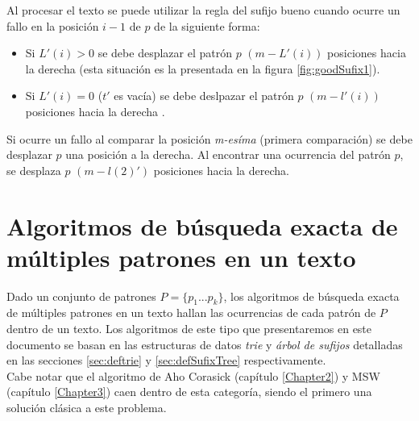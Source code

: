 \myrule{}{}
Al procesar el texto se puede utilizar la regla del sufijo bueno cuando ocurre un fallo en la posición $i-1$ de $p$ de la siguiente forma:
\begin{itemize}
\item Si $L'(i) > 0$ se debe desplazar el patrón $p$ $(m - L'(i))$ posiciones hacia la derecha (esta situación es la presentada en la figura \ref{fig:goodSufix1}).
\item Si $L'(i) = 0$ ($t'$ es vacía) se debe deslpazar el patrón $p$ $(m - l'(i))$ posiciones hacia la derecha .
\end{itemize}
Si ocurre un fallo al comparar la posición {\it m-esíma} (primera comparación) se debe desplazar $p$ una posición a la derecha.
Al encontrar una ocurrencia del patrón $p$, se desplaza $p$ $(m - l(2)')$ posiciones hacia la derecha.
\section{Algoritmos de búsqueda exacta de múltiples patrones en un texto}
Dado un conjunto de patrones $P=\{p_{1}...p_{k}\}$, los algoritmos de búsqueda exacta de múltiples patrones en un texto hallan las ocurrencias de cada patrón de $P$ dentro de un texto.
Los algoritmos de este tipo que presentaremos en este documento se basan en las estructuras de datos {\it trie} y {\it árbol de sufijos} detalladas en las secciones \ref{sec:deftrie} y \ref{sec:defSufixTree} respectivamente.\\
Cabe notar que el algoritmo de Aho Corasick (capítulo \ref{Chapter2}) y MSW (capítulo \ref{Chapter3}) caen dentro de esta categoría, siendo el primero una solución clásica a este problema.
